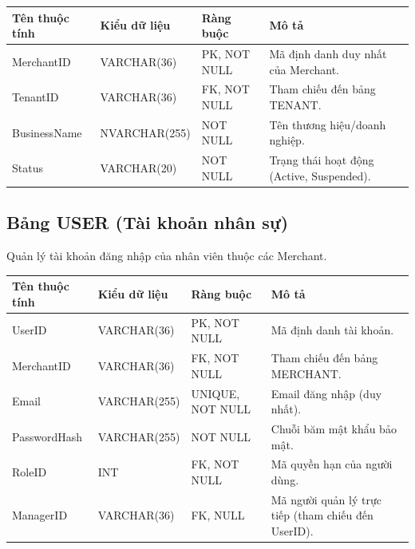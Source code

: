 \begin{table}[H]
    \centering
    \renewcommand{\arraystretch}{1.3}
    \begin{tabular}{|>{\raggedright\arraybackslash}p{3cm}|>{\raggedright\arraybackslash}p{3.2cm}|>{\raggedright\arraybackslash}p{2.5cm}|>{\raggedright\arraybackslash}p{5.5cm}|}
        \hline
        \textbf{Tên thuộc tính} & \textbf{Kiểu dữ liệu} & \textbf{Ràng buộc} & \textbf{Mô tả} \\ \hline
        MerchantID & VARCHAR(36) & PK, NOT NULL & Mã định danh duy nhất của Merchant. \\ \hline
        TenantID & VARCHAR(36) & FK, NOT NULL & Tham chiếu đến bảng TENANT. \\ \hline
        BusinessName & NVARCHAR(255) & NOT NULL & Tên thương hiệu/doanh nghiệp. \\ \hline
        Status & VARCHAR(20) & NOT NULL & Trạng thái hoạt động (Active, Suspended). \\ \hline
    \end{tabular}
\end{table}

\subsection{Bảng USER (Tài khoản nhân sự)}
Quản lý tài khoản đăng nhập của nhân viên thuộc các Merchant.

\begin{table}[H]
    \centering
    \renewcommand{\arraystretch}{1.3}
    \begin{tabular}{|>{\raggedright\arraybackslash}p{3cm}|>{\raggedright\arraybackslash}p{3.2cm}|>{\raggedright\arraybackslash}p{2.5cm}|>{\raggedright\arraybackslash}p{5.5cm}|}
        \hline
        \textbf{Tên thuộc tính} & \textbf{Kiểu dữ liệu} & \textbf{Ràng buộc} & \textbf{Mô tả} \\ \hline
        UserID & VARCHAR(36) & PK, NOT NULL & Mã định danh tài khoản. \\ \hline
        MerchantID & VARCHAR(36) & FK, NOT NULL & Tham chiếu đến bảng MERCHANT. \\ \hline
        Email & VARCHAR(255) & UNIQUE, NOT NULL & Email đăng nhập (duy nhất). \\ \hline
        PasswordHash & VARCHAR(255) & NOT NULL & Chuỗi băm mật khẩu bảo mật. \\ \hline
        RoleID & INT & FK, NOT NULL & Mã quyền hạn của người dùng. \\ \hline
        ManagerID & VARCHAR(36) & FK, NULL & Mã người quản lý trực tiếp (tham chiếu đến UserID). \\ \hline
    \end{tabular}
\end{table}

